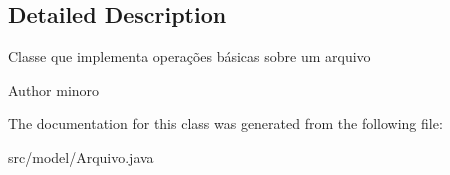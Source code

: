 \subsection{Detailed Description}
Classe que implementa operações básicas sobre um arquivo

\begin{DoxyAuthor}{Author}
minoro 
\end{DoxyAuthor}


The documentation for this class was generated from the following file\+:\begin{DoxyCompactItemize}
\item 
src/model/Arquivo.\+java\end{DoxyCompactItemize}
